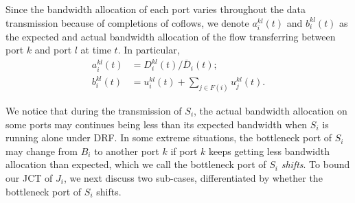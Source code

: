 \documentclass[10pt, conference, letterpaper]{IEEEtran}
\begin{document}
\begin{IEEEproof}
Since the bandwidth allocation of each port varies throughout the data transmission because of completions of coflows, we denote $a_i^{kl}(t)$ and $b_i^{kl}(t)$ as the expected and actual bandwidth allocation of the flow transferring between port $k$ and port $l$ at time $t$. In particular,
\begin{align}
	\label{actual} a_i^{kl}(t) &= D_i^{kl}(t)/\overline{D}_i(t);\\
	b_i^{kl}(t) &= u_i^{kl}(t) + \sum_{j\in F(i)}u_j^{kl}(t).
\end{align}

We notice that during the transmission of $S_i$, the actual bandwidth allocation on some ports may continues being less than its expected bandwidth when $S_i$  is running alone under DRF. In some extreme situations, the bottleneck port of $S_i$ may change from $B_i$ to another port $k$ if port $k$ keeps getting less bandwidth allocation than expected, which we call the bottleneck port of $S_i$ \emph{shifts}. To bound our JCT of $J_i$, we next discuss two sub-cases, differentiated by whether the bottleneck port of $S_i$ shifts.


\end{IEEEproof}
\end{document}
